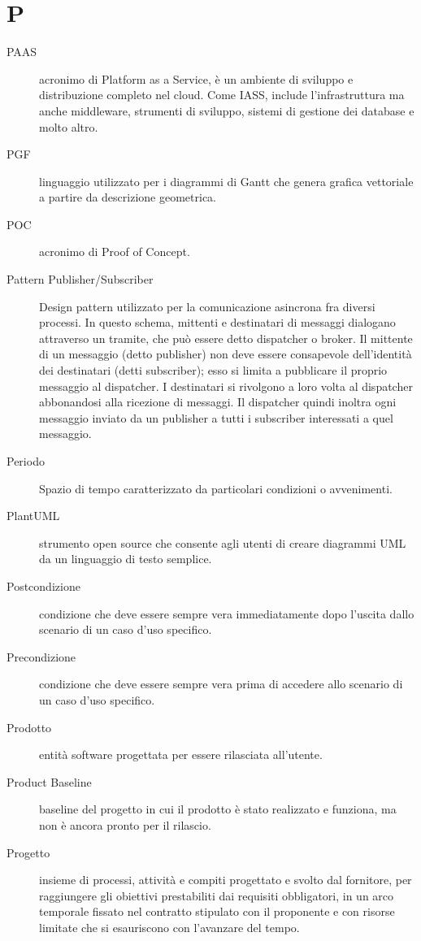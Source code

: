 \documentclass{article}
\begin{document}
\section{P}
\begin{description}
  \item[PAAS] acronimo di Platform as a Service, è un ambiente di sviluppo e distribuzione completo nel cloud. Come IASS, include l'infrastruttura ma anche middleware, strumenti di sviluppo, sistemi di gestione dei database e molto altro.
  \item[PGF] linguaggio utilizzato per i diagrammi di Gantt che genera grafica vettoriale a partire da descrizione geometrica.
  \item[POC] acronimo di Proof of Concept.
  \item[Pattern Publisher/Subscriber] Design pattern utilizzato per la comunicazione asincrona fra diversi processi. In questo schema, mittenti e destinatari di messaggi dialogano attraverso un tramite, che può essere detto dispatcher o broker. Il mittente di un messaggio (detto publisher) non deve essere consapevole dell'identità dei destinatari (detti subscriber); esso si limita a pubblicare il proprio messaggio al dispatcher. I destinatari si rivolgono a loro volta al dispatcher abbonandosi alla ricezione di messaggi. Il dispatcher quindi inoltra ogni messaggio inviato da un publisher a tutti i subscriber interessati a quel messaggio.
  \item[Periodo] Spazio di tempo caratterizzato da particolari condizioni o avvenimenti.
  \item[PlantUML] strumento open source che consente agli utenti di creare diagrammi UML da un linguaggio di testo semplice.
  \item[Postcondizione] condizione che deve essere sempre vera immediatamente dopo l'uscita dallo scenario di un caso d'uso specifico.
  \item[Precondizione] condizione che deve essere sempre vera prima di accedere allo scenario di un caso d'uso specifico.
  \item[Prodotto] entità software progettata per essere rilasciata all'utente.
  \item[Product Baseline] baseline del progetto in cui il prodotto è stato realizzato e funziona, ma non è ancora pronto per il rilascio.
  \item[Progetto] insieme di processi, attività e compiti progettato e svolto dal fornitore, per raggiungere gli obiettivi prestabiliti dai requisiti obbligatori, in un arco temporale fissato nel contratto stipulato con il proponente e con risorse limitate che si esauriscono con l'avanzare del tempo.

\end{description}
\end{document}
